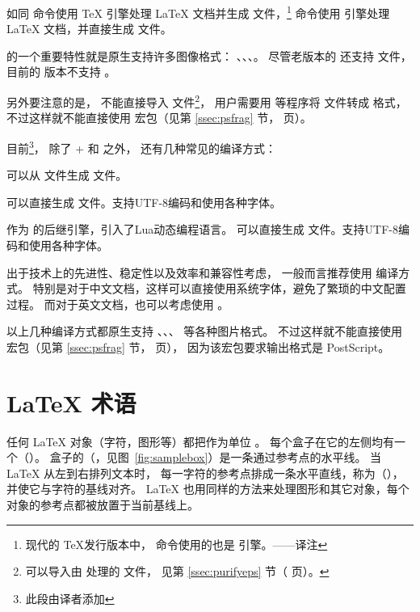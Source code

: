 如同  命令使用 \TeX{} 引擎处理 \LaTeX{} 文档并生成  文件，\footnote{
现代的 \TeX 发行版本中， 命令使用的也是 \pdfTeX{} 引擎。——译注}
 命令使用 \pdfTeX{} 引擎处理 \LaTeX{} 文档，并直接生成  文件。
 
\pdfTeX{} 的一个重要特性就是原生支持许多图像格式：
、、、\MetaPost。
尽管老版本的 \pdfTeX{} 还支持  文件，目前的 \pdfTeX{} 版本不支持 。

另外要注意的是，\pdfTeX{} 不能直接导入  文件\footnote{
    \pdfTeX{} 可以导入由  处理的  文件，
	见第 \ref{ssec:purifyeps} 节（\pageref{ssec:purifyeps} 页）。}，
用户需要用  等程序将  文件转成  格式，
不过这样就不能直接使用  宏包（见第 \ref{ssec:psfrag} 节，\pageref{ssec:psfrag} 页）。

目前\footnote{
    此段由译者添加}，
除了 + 和  之外，
还有几种常见的编译方式：
\begin{description}
	\item {} 可以从  文件生成  文件。
	\item {} 可以直接生成  文件。支持UTF-8编码和使用各种字体。
	\item {} 作为  的后继引擎，引入了Lua动态编程语言。
	可以直接生成  文件。支持UTF-8编码和使用各种字体。
\end{description}
出于技术上的先进性、稳定性以及效率和兼容性考虑，
一般而言推荐使用  编译方式。
特别是对于中文文档，这样可以直接使用系统字体，避免了繁琐的中文配置过程。
而对于英文文档，也可以考虑使用 。

以上几种编译方式都原生支持 、、、 等各种图片格式。
不过这样就不能直接使用  宏包（见第 \ref{ssec:psfrag} 节，\pageref{ssec:psfrag} 页），
因为该宏包要求输出格式是 PostScript。


\section{\LaTeX{} 术语}\label{sec:terminology}

任何 \LaTeX{} 对象（字符，图形等）都把作为单位 \cite[103页]{Lamport1994}。
每个盒子在它的左侧均有一个（）。
盒子的（，见图~\ref{fig:samplebox}）是一条通过参考点的水平线。
当 \LaTeX{} 从左到右排列文本时，
每一字符的参考点排成一条水平直线，称为（），
并使它与字符的基线对齐。
\LaTeX{} 也用同样的方法来处理图形和其它对象，每个对象的参考点都被放置于当前基线上。

